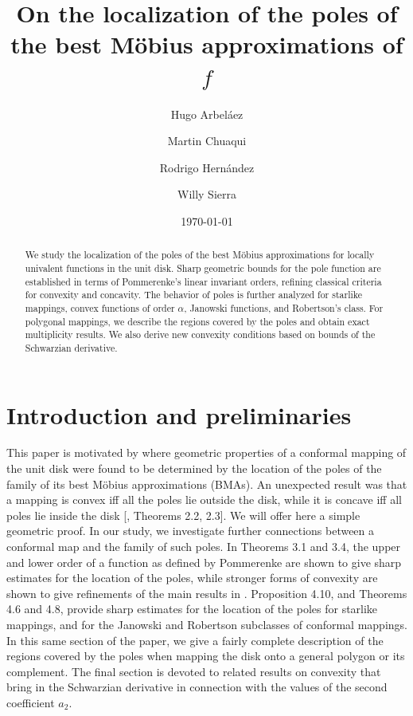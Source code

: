 \documentclass[reqno]{amsart}
\title[Localization of the poles of the best M\"obius approximations of $f$]{On the localization of the poles of the best M\"obius approximations of $f$}
\date{\today}
\author[H. Arbel\'aez]{Hugo Arbel\'aez}
\author[M. Chuaqui]{Martin Chuaqui}
\author[R. Hernández]{Rodrigo Hernández}
\author[W. Sierra]{Willy Sierra}
\theoremstyle{plain}
\theoremstyle{definition}
\begin{document}
\maketitle

\begin{abstract}
We study the localization of the poles of the best Möbius approximations for locally univalent functions in the unit disk. Sharp geometric bounds for the pole function are established in terms of Pommerenke’s linear invariant orders, refining classical criteria for convexity and concavity. The behavior of poles is further analyzed for starlike mappings, convex functions of order $\alpha$, Janowski functions, and Robertson’s class. For polygonal mappings, we describe the regions covered by the poles and obtain exact multiplicity results. We also derive new convexity conditions based on bounds of the Schwarzian derivative.

\end{abstract}

\section{Introduction and preliminaries}

This paper is motivated by \cite{Chuaqui2024} where geometric properties of a conformal mapping of the unit disk were found to be determined by the location of the poles of the family of its best Möbius approximations (BMAs). An unexpected result was that a mapping is convex iff all the poles lie outside the disk, while it is concave iff all poles lie inside the disk [\cite{Chuaqui2024}, Theorems 2.2, 2.3]. We will offer here a simple geometric proof. In our study, we investigate further connections between a conformal map and the family of such poles. In Theorems 3.1 and 3.4, the upper and lower order of a function as defined by Pommerenke are shown to give sharp estimates for the location of the poles, while stronger forms of convexity are shown to give refinements of the main results in \cite{Chuaqui2024}. Proposition 4.10, and Theorems 4.6 and 4.8, provide sharp estimates for the location of the poles for starlike mappings, and for the Janowski and Robertson subclasses of conformal mappings. In this same section of the paper, we give a fairly complete description of the regions covered by the poles when mapping the disk onto a general polygon or its complement. The final section is devoted to related results on convexity that bring in the Schwarzian derivative in connection with the values of the second coefficient $a_2$. 
\end{document}
